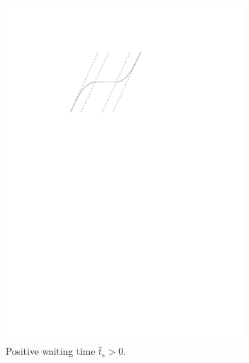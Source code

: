 \documentclass[a4paper]{article}
\theoremstyle{definition}
\theoremstyle{plain}
\begin{document}
\begin{figure}
  \centering
\begin{subfigure}{0.4\textwidth}
    \includegraphics[scale=1]{figures/motion/single_trajectory_split}
    \caption{Positive waiting time $\bar{t}_{s} > 0$.}
    \label{fig:single_trajectory_split}
\end{subfigure}
\hfill
\begin{subfigure}{0.3\textwidth}

\end{subfigure}
\end{figure}
\end{document}
